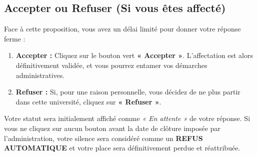 \documentclass[12pt,a4paper]{article}
\begin{document}
\subsection{Accepter ou Refuser (Si vous êtes affecté)}
Face à cette proposition, vous avez un délai limité pour donner votre réponse ferme :
\begin{enumerate}
    \item \textbf{Accepter :} Cliquez sur le bouton vert \textbf{« Accepter »}. L'affectation est alors définitivement validée, et vous pourrez entamer vos démarches administratives.
    \item \textbf{Refuser :} Si, pour une raison personnelle, vous décidez de ne plus partir dans cette université, cliquez sur \textbf{« Refuser »}. 
\end{enumerate}

\begin{tcolorbox}[colback=red!5!white,colframe=red!75!black,title=⚠️ ATTENTION AU DÉLAI DE RÉPONSE]
Votre statut sera initialement affiché comme \textit{« En attente »} de votre réponse. Si vous ne cliquez sur aucun bouton avant la date de clôture imposée par l'administration, votre silence sera considéré comme un \textbf{REFUS AUTOMATIQUE} et votre place sera définitivement perdue et réattribuée.
\end{tcolorbox}
\end{document}
